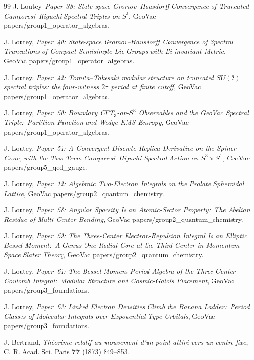 \documentclass[11pt,a4paper]{article}
\theoremstyle{plain}
\theoremstyle{definition}
\newcommand{\sphere}[1]{S^{#1}}
\begin{document}
\begin{thebibliography}{99}
J. Loutey, \emph{Paper~38:  State-space Gromov--Hausdorff Convergence of Truncated Camporesi--Higuchi Spectral Triples on $\sphere{3}$}, GeoVac papers/group1\_operator\_algebras.

J. Loutey, \emph{Paper~40:  State-space Gromov--Hausdorff Convergence of Spectral Truncations of Compact Semisimple Lie Groups with Bi-invariant Metric}, GeoVac papers/group1\_operator\_algebras.

J. Loutey, \emph{Paper~42:  Tomita--Takesaki modular structure on truncated $SU(2)$ spectral triples: the four-witness $2\pi$ period at finite cutoff}, GeoVac papers/group1\_operator\_algebras.

J. Loutey, \emph{Paper~50:  Boundary CFT$_3$-on-$S^3$ Observables and the GeoVac Spectral Triple:\ Partition Function and Wedge KMS Entropy}, GeoVac papers/group1\_operator\_algebras.

J. Loutey, \emph{Paper~51:  A Convergent Discrete Replica Derivative on the Spinor Cone, with the Two-Term Camporesi--Higuchi Spectral Action on $\sphere{3} \times S^1$}, GeoVac papers/group5\_qed\_gauge.

J. Loutey, \emph{Paper~12:  Algebraic Two-Electron Integrals on the Prolate Spheroidal Lattice}, GeoVac papers/group2\_quantum\_chemistry.

J. Loutey, \emph{Paper~58:  Angular Sparsity Is an Atomic-Sector Property:\ The Abelian Residue of Multi-Center Bonding}, GeoVac papers/group2\_quantum\_chemistry.

J. Loutey, \emph{Paper~59:  The Three-Center Electron-Repulsion Integral Is an Elliptic Bessel Moment:\ A Genus-One Radial Core at the Third Center in Momentum-Space Slater Theory}, GeoVac papers/group2\_quantum\_chemistry.

J. Loutey, \emph{Paper~61:  The Bessel-Moment Period Algebra of the Three-Center Coulomb Integral:\ Modular Structure and Cosmic-Galois Placement}, GeoVac papers/group3\_foundations.

J. Loutey, \emph{Paper~63:  Linked Electron Densities Climb the Banana Ladder:\ Period Classes of Molecular Integrals over Exponential-Type Orbitals}, GeoVac papers/group3\_foundations.

J. Bertrand, \emph{Th\'eor\`eme relatif au mouvement d'un point attir\'e vers un centre fixe}, C. R. Acad. Sci. Paris \textbf{77} (1873) 849--853.


\end{thebibliography}
\end{document}
